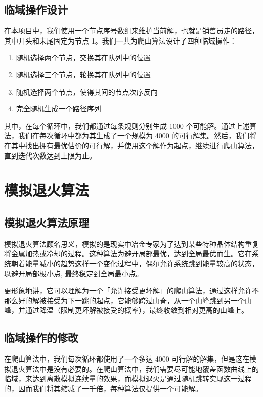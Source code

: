 \documentclass[12pt]{article}%
\begin{document}
\subsection{临域操作设计}

在本项目中，我们使用一个节点序号数组来维护当前解，也就是销售员走的路径，其中开头和末尾固定为节点 1。我们一共为爬山算法设计了四种临域操作：

\begin{enumerate}
    \item 随机选择两个节点，交换其在队列中的位置
    \item 随机选择三个节点，轮换其在队列中的位置
    \item 随机选择两个节点，使得其间的节点次序反向
    \item 完全随机生成一个路径序列
\end{enumerate}

其中，在每个循环中，我们都通过每条规则分别生成 1000 个可能解。通过上述算法，我们在每次循环中都为其生成了一个规模为 4000 的可行解集。然后，我们将在其中找出拥有最优估价的可行解，并使用这个解作为起点，继续进行爬山算法，直到迭代次数达到上限为止。

\section{模拟退火算法}

\subsection{模拟退火算法原理}

模拟退火算法顾名思义，模拟的是现实中冶金专家为了达到某些特种晶体结构重复将金属加热或冷却的过程。这种算法为避开局部最优，达到全局最优而生。它在系统朝着能量减小的趋势这样一个变化过程中，偶尔允许系统跳到能量较高的状态，以避开局部极小点, 最终稳定到全局最小点。

更形象地讲，它可以理解为一个「允许接受更坏解」的爬山算法，通过这样允许不那么好的解被接受为下一跳的起点，它能够跨过山脊，从一个山峰跳到另一个山峰，并通过降温（限制更坏解被接受的概率），最终收敛到相对更高的山峰上。

\subsection{临域操作的修改}

在爬山算法中，我们每次循环都使用了一个多达 4000 可行解的解集，但是这在模拟退火算法中是没有必要的。在爬山算法中，我们需要尽可能地覆盖函数曲线上的临域，来达到离散模拟连续量的效果，而模拟退火是通过随机跳转实现这一过程的，因而我们将其缩减了一千倍，每种算法仅提供一个可能解。
\end{document}
